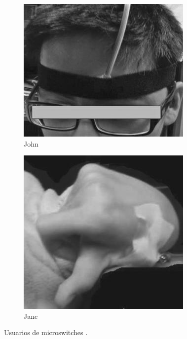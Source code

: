 \begin{figure}[H]
\centering
\begin{subfigure}{0.5\textwidth} 
  \centering
  \includegraphics[width=0.5\linewidth]{Contexto/eyebrow.jpg}
  \caption{John}
  \label{John}
\end{subfigure}
\begin{subfigure}{0.5\textwidth}
  \centering
  \includegraphics[width=0.5\linewidth]{Contexto/finger.jpg}
  \caption{Jane}
  \label{Jane}
\end{subfigure}
\caption{Usuarios de microswitches \cite{chau2016paediatric}.} 
\label{usos microswitches}
\end{figure}


